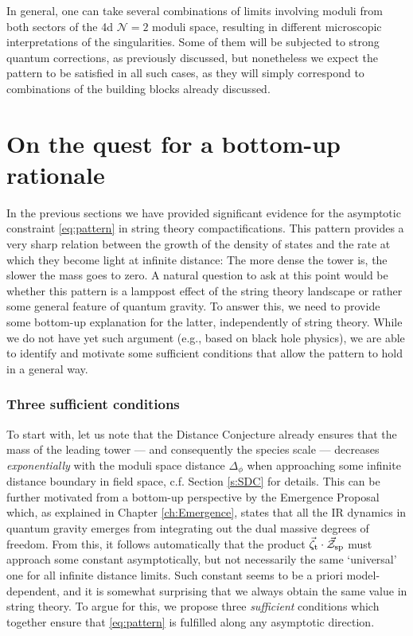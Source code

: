 In general, one can take several combinations of limits involving moduli from both sectors of the 4d $\mathcal{N}=2$ moduli space, resulting in different microscopic interpretations of the singularities. Some of them will be subjected to strong quantum corrections, as previously discussed, but nonetheless we expect the pattern to be satisfied in all such cases, as they will simply correspond to combinations of the building blocks already discussed.

\section{On the quest for a bottom-up rationale}
\label{s:bottomup}
		
In the previous sections we have provided significant evidence for the asymptotic constraint \eqref{eq:pattern} in string theory compactifications. This pattern provides a very sharp relation between the growth of the density of states and the rate at which they become light at infinite distance: The more dense the tower is, the slower the mass goes to zero. A natural question to ask at this point would be whether this pattern is a lamppost effect of the string theory landscape or rather some general feature of quantum gravity. To answer this, we need to provide some bottom-up explanation for the latter, independently of string theory. While we do not have yet such argument (e.g., based on black hole physics), we are able to identify and motivate some sufficient conditions that allow the pattern to hold in a general way.

\subsubsection*{Three sufficient conditions}

To start with, let us note that the Distance Conjecture \cite{Ooguri:2006in} already ensures that the mass of the leading tower --- and consequently the species scale --- decreases \emph{exponentially} with the moduli space distance $\Delta_{\phi}$ when approaching some infinite distance boundary in field space, c.f. Section \ref{s:SDC} for details. This can be further motivated from a bottom-up perspective by the Emergence Proposal which, as explained in Chapter \ref{ch:Emergence}, states that all the IR dynamics in quantum gravity emerges from integrating out the dual massive degrees of freedom. From this, it follows automatically that the product $\vec{\zeta}_{\rm t}\cdot \vec{\mathcal{Z}}_{\rm sp}$ must approach some constant asymptotically, but not necessarily the same `universal' one for all infinite distance limits. Such constant seems to be a priori model-dependent, and it is somewhat surprising that we always obtain the same value in string theory. To argue for this, we propose three \emph{sufficient} conditions which together ensure that \eqref{eq:pattern} is fulfilled along any asymptotic direction. 	
	
